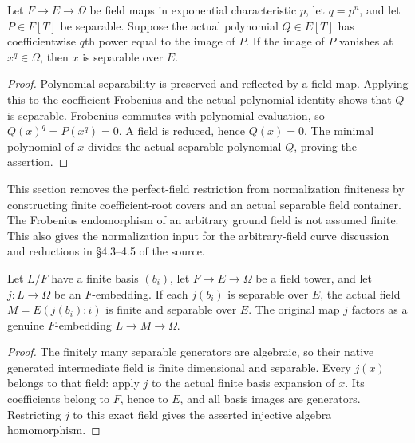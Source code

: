 \begin{lemma}
\label{lem:normalization-rooted-frobenius-separable}
\leanok
Let $F\to E\to\Omega$ be field maps in exponential characteristic
$p$, let $q=p^n$, and let $P\in F[T]$ be separable. Suppose the actual
polynomial $Q\in E[T]$ has coefficientwise $q$th power equal to the
image of $P$. If the image of $P$ vanishes at $x^q\in\Omega$, then
$x$ is separable over $E$.
\end{lemma}
\begin{proof}
Polynomial separability is preserved and reflected by a field map.
Applying this to the coefficient Frobenius and the actual polynomial
identity shows that $Q$ is separable. Frobenius commutes with polynomial
evaluation, so $Q(x)^q=P(x^q)=0$. A field is reduced, hence $Q(x)=0$.
The minimal polynomial of $x$ divides the actual separable polynomial
$Q$, proving the assertion.
\end{proof}

\endgroup

\begingroup

This section removes the perfect-field restriction from normalization
finiteness by constructing finite coefficient-root covers and an actual
separable field container. The Frobenius endomorphism of an arbitrary
ground field is not assumed finite. This also gives the normalization
input for the arbitrary-field curve discussion and reductions in
\S4.3--4.5 of the source.

\begin{lemma}
\label{lem:normalization-finite-separable-basis-container}
\leanok
Let $L/F$ have a finite basis $(b_i)$, let $F\to E\to\Omega$ be
a field tower, and let $j:L\to\Omega$ be an $F$-embedding. If each
$j(b_i)$ is separable over $E$, the actual field
$M=E(j(b_i):i)$ is finite and separable over $E$. The original map
$j$ factors as a genuine $F$-embedding $L\to M\to\Omega$.
\end{lemma}
\begin{proof}
The finitely many separable generators are algebraic, so their native
generated intermediate field is finite dimensional and separable.
Every $j(x)$ belongs to that field: apply $j$ to the actual finite
basis expansion of $x$. Its coefficients belong to $F$, hence to $E$,
and all basis images are generators. Restricting $j$ to this exact
field gives the asserted injective algebra homomorphism.
\end{proof}

